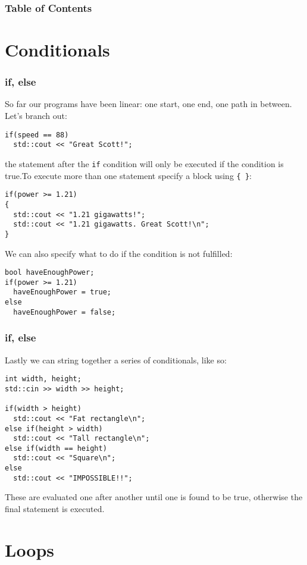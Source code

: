 \documentclass{beamer}
\subtitle{Session 2: Control structure}
\begin{document}
\frame{\titlepage}

\begin{frame}
\frametitle{Table of Contents}
\tableofcontents
\end{frame}

\section{Conditionals}

\begin{frame}[fragile]
	\frametitle{if, else}
	So far our programs have been linear: one start, one end, one path in between.  Let's branch out:
	\pause
	\begin{lstlisting}
if(speed == 88)
  std::cout << "Great Scott!";
	\end{lstlisting}
	the statement after the \texttt{if} condition will only be executed if the condition is true.\pause  To execute more than one statement specify a block using \texttt{\{ \}}:
	\begin{lstlisting}
if(power >= 1.21)
{
  std::cout << "1.21 gigawatts!";
  std::cout << "1.21 gigawatts. Great Scott!\n";
}
	\end{lstlisting} 
	\pause
	We can also specify what to do if the condition is not fulfilled:
	\begin{lstlisting}
bool haveEnoughPower;
if(power >= 1.21)
  haveEnoughPower = true;
else
  haveEnoughPower = false;	
	\end{lstlisting}
\end{frame}



\begin{frame}[fragile]
  \frametitle{if, else}
  Lastly we can string together a series of conditionals, like so:
	\begin{lstlisting}
int width, height;
std::cin >> width >> height;
	
if(width > height)
  std::cout << "Fat rectangle\n";
else if(height > width)
  std::cout << "Tall rectangle\n";
else if(width == height)
  std::cout << "Square\n";
else
  std::cout << "IMPOSSIBLE!!";
	\end{lstlisting}
	These are evaluated one after another until one is found to be true, otherwise the final  statement is executed.
	\pause
\end{frame}

\section{Loops}
\end{document}
